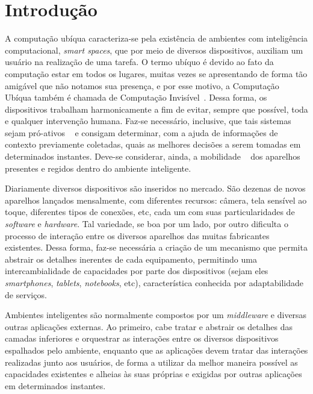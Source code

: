 \chapter{Introdução}

A computação ubíqua caracteriza-se pela existência de ambientes com inteligência computacional, \emph{smart spaces}, que por meio de diversos dispositivos, auxiliam um usuário na realização de uma tarefa. O termo ubíquo é devido ao fato da computação estar em todos os lugares, muitas vezes se apresentando de forma tão amigável que não notamos sua presença, e por esse motivo, a Computação Ubíqua também é chamada de Computação Invisível~\cite{gomes2007, weiser1993, weiser1999}. Dessa forma, os dispositivos trabalham harmonicamente a fim de evitar, sempre que possível, toda e qualquer intervenção humana. Faz-se necessário, inclusive, que tais sistemas sejam pró-ativos ~\cite{gomes2007, buzeto2010} e consigam determinar, com a ajuda de informações de contexto previamente coletadas, quais as melhores decisões a serem tomadas em determinados instantes. Deve-se considerar, ainda, a mobilidade ~\cite{gomes2007, buzeto2010, weiser1999} dos aparelhos presentes e regidos dentro do ambiente inteligente.

Diariamente diversos dispositivos são inseridos no mercado. São dezenas de novos aparelhos lançados mensalmente, com diferentes recursos: câmera, tela sensível ao toque, diferentes tipos de conexões, etc, cada um com suas particularidades de \emph{software} e \emph{hardware}. Tal variedade, se boa por um lado, por outro dificulta o processo de interação entre os diversos aparelhos das muitas fabricantes existentes. Dessa forma, faz-se necessária a criação de um mecanismo que permita abstrair os detalhes inerentes de cada equipamento, permitindo uma intercambialidade de capacidades por parte dos dispositivos (sejam eles \emph{smartphones}, \emph{tablets}, \emph{notebooks}, etc), característica conhecida por adaptabilidade de serviços.

Ambientes inteligentes são normalmente compostos por um \emph{middleware} e diversas outras aplicações externas. Ao primeiro, cabe tratar e abstrair os detalhes das camadas inferiores e orquestrar as interações entre os diversos dispositivos espalhados pelo ambiente, enquanto que as aplicações devem tratar das interações realizadas junto aos usuários, de forma a utilizar da melhor maneira possível as capacidades existentes e alheias às suas próprias e exigidas por outras aplicações em determinados instantes.

